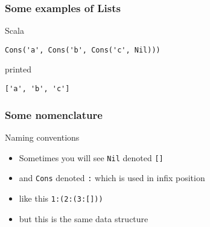 \begin{frame}[fragile]
\frametitle{Some examples of Lists}
\begin{block}{Scala}
\begin{lstlisting}[style=scala,basicstyle=\scriptsize\ttfamily,mathescape]
Cons('a', Cons('b', Cons('c', Nil)))
\end{lstlisting}
\end{block}
\begin{block}{printed}
\begin{lstlisting}[style=scala,basicstyle=\scriptsize\ttfamily,mathescape]
['a', 'b', 'c']
\end{lstlisting}
\end{block}
\end{frame}

\begin{frame}
\frametitle{Some nomenclature}
\begin{block}{Naming conventions}
\begin{itemize}
\item<1-> Sometimes you will see \lstinline{Nil} denoted \lstinline{[]}
\item<2-> and \lstinline{Cons} denoted \lstinline{:} which is used in infix position
\item<3-> like this \lstinline{1:(2:(3:[]))}
\item<4-> but this is the same data structure
\end{itemize}
\end{block}
\end{frame}
